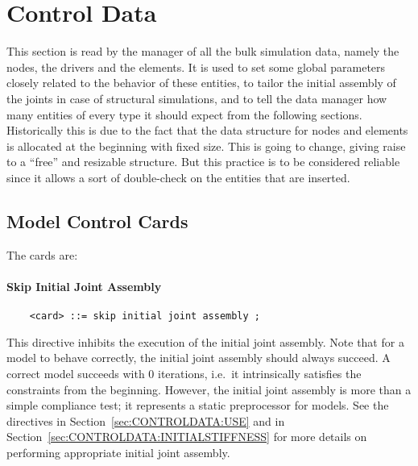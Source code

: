 %
%
%
%
%
% 
%
%

\chapter{Control Data}\label{sec:CONTROL-DATA}
This section is read by the manager of all the bulk simulation data, namely
the nodes, the drivers and the elements. It is used to set some global
parameters closely related to the behavior of these entities, to tailor the
initial assembly of the joints in case of structural simulations, and to
tell the data manager how many entities of every type it should expect from
the following sections. Historically this is due to the fact that the data
structure for nodes and elements is allocated at the beginning with fixed
size. This is going to change, giving raise to a ``free'' and resizable
structure. But this practice is to be considered reliable since it allows a
sort of double-check on the entities that are inserted.

\section{Model Control Cards}
The cards are: 

\subsubsection{Skip Initial Joint Assembly}
\begin{verbatim}
    <card> ::= skip initial joint assembly ;
\end{verbatim}
This directive inhibits the execution of the initial joint assembly.
Note that for a model to behave correctly, the initial joint assembly
should always succeed.
A correct model succeeds with 0 iterations, i.e.\ it intrinsically 
satisfies the constraints from the beginning.
However, the initial joint assembly is more than a simple compliance
test; it represents a static preprocessor for models.
See the directives  in Section~\ref{sec:CONTROLDATA:USE}
and  in Section~\ref{sec:CONTROLDATA:INITIALSTIFFNESS}
for more details on performing appropriate initial joint assembly.



